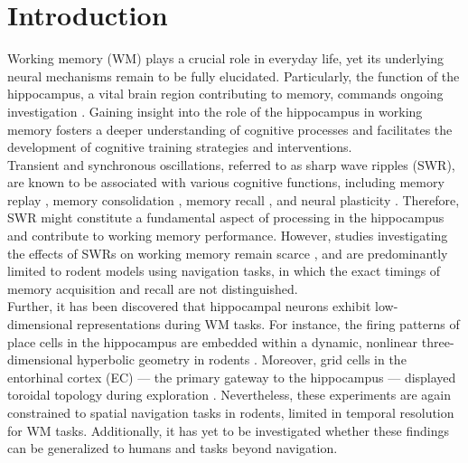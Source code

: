 \section{Introduction}
Working memory (WM) plays a crucial role in everyday life, yet its underlying neural mechanisms remain to be fully elucidated. Particularly, the function of the hippocampus, a vital brain region contributing to memory, commands ongoing investigation \cite{scoville_loss_1957,squire_legacy_2009,boran_persistent_2019,kaminski_persistently_2017,kornblith_persistent_2017,faraut_dataset_2018,borders_hippocampus_2022,li_functional_2023,dimakopoulos_information_2022}. Gaining insight into the role of the hippocampus in working memory fosters a deeper understanding of cognitive processes and facilitates the development of cognitive training strategies and interventions.
\\
\indent
Transient and synchronous oscillations, referred to as sharp wave ripples (SWR), are known to be associated with various cognitive functions, including memory replay \cite{wilson_reactivation_1994,nadasdy_replay_1999,lee_memory_2002,davidson_hippocampal_2009}, memory consolidation \cite{girardeau_selective_2009,ego-stengel_disruption_2010,fernandez-ruiz_long-duration_2019,kim_corticalhippocampal_2022}, memory recall \cite{wu_hippocampal_2017,norman_hippocampal_2019,norman_hippocampal_2021}, and neural plasticity \cite{behrens_induction_2005,norimoto_hippocampal_2018}. Therefore, SWR might constitute a fundamental aspect of processing in the hippocampus and contribute to working memory performance. However, studies investigating the effects of SWRs on working memory remain scarce \cite{jadhav_awake_2012}, and are predominantly limited to rodent models using navigation tasks, in which the exact timings of memory acquisition and recall are not distinguished.
\\
\indent
Further, it has been discovered that hippocampal neurons exhibit low-dimensional representations during WM tasks. For instance, the firing patterns of place cells \cite{okeefe_hippocampus_1971,okeefe_place_1976,ekstrom_cellular_2003,kjelstrup_finite_2008,harvey_intracellular_2009,royer_control_2012} in the hippocampus are embedded within a dynamic, nonlinear three-dimensional hyperbolic geometry in rodents \cite{zhang_hippocampal_2022}. Moreover, grid cells in the entorhinal cortex (EC) --- the primary gateway to the hippocampus \cite{naber_reciprocal_2001,van_strien_anatomy_2009,strange_functional_2014} --- displayed toroidal topology during exploration \cite{gardner_toroidal_2022}. Nevertheless, these experiments are again constrained to spatial navigation tasks in rodents, limited in temporal resolution for WM tasks. Additionally, it has yet to be investigated whether these findings can be generalized to humans and tasks beyond navigation.
